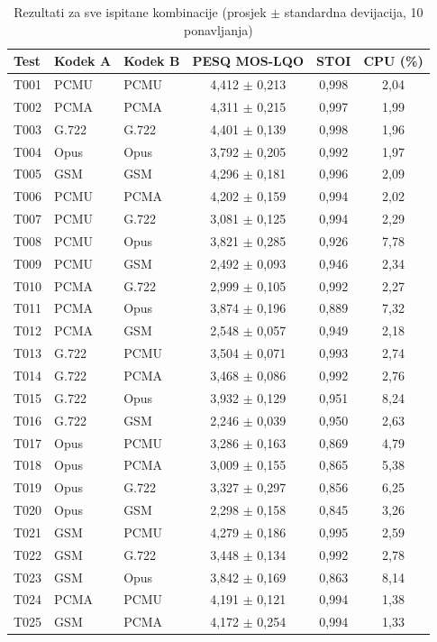 \begin{table}[htbp]
\centering
\caption{Rezultati za sve ispitane kombinacije (prosjek $\pm$ standardna devijacija, 10 ponavljanja)}
\label{tab:complete-results}
\scriptsize
\begin{tabular}{|l|l|l|c|c|c|}
\hline
\textbf{Test} & \textbf{Kodek A} & \textbf{Kodek B} & \textbf{PESQ MOS-LQO} & \textbf{STOI} & \textbf{CPU (\%)} \\
\hline
T001 & PCMU & PCMU & 4,412 $\pm$ 0,213 & 0,998 & 2,04 \\
T002 & PCMA & PCMA & 4,311 $\pm$ 0,215 & 0,997 & 1,99 \\
T003 & G.722 & G.722 & 4,401 $\pm$ 0,139 & 0,998 & 1,96 \\
T004 & Opus & Opus & 3,792 $\pm$ 0,205 & 0,992 & 1,97 \\
T005 & GSM & GSM & 4,296 $\pm$ 0,181 & 0,996 & 2,09 \\
\hline
T006 & PCMU & PCMA & 4,202 $\pm$ 0,159 & 0,994 & 2,02 \\
T007 & PCMU & G.722 & 3,081 $\pm$ 0,125 & 0,994 & 2,29 \\
T008 & PCMU & Opus & 3,821 $\pm$ 0,285 & 0,926 & 7,78 \\
T009 & PCMU & GSM & 2,492 $\pm$ 0,093 & 0,946 & 2,34 \\
T010 & PCMA & G.722 & 2,999 $\pm$ 0,105 & 0,992 & 2,27 \\
T011 & PCMA & Opus & 3,874 $\pm$ 0,196 & 0,889 & 7,32 \\
T012 & PCMA & GSM & 2,548 $\pm$ 0,057 & 0,949 & 2,18 \\
T013 & G.722 & PCMU & 3,504 $\pm$ 0,071 & 0,993 & 2,74 \\
T014 & G.722 & PCMA & 3,468 $\pm$ 0,086 & 0,992 & 2,76 \\
T015 & G.722 & Opus & 3,932 $\pm$ 0,129 & 0,951 & 8,24 \\
T016 & G.722 & GSM & 2,246 $\pm$ 0,039 & 0,950 & 2,63 \\
T017 & Opus & PCMU & 3,286 $\pm$ 0,163 & 0,869 & 4,79 \\
T018 & Opus & PCMA & 3,009 $\pm$ 0,155 & 0,865 & 5,38 \\
T019 & Opus & G.722 & 3,327 $\pm$ 0,297 & 0,856 & 6,25 \\
T020 & Opus & GSM & 2,298 $\pm$ 0,158 & 0,845 & 3,26 \\
T021 & GSM & PCMU & 4,279 $\pm$ 0,186 & 0,995 & 2,59 \\
T022 & GSM & G.722 & 3,448 $\pm$ 0,134 & 0,992 & 2,78 \\
T023 & GSM & Opus & 3,842 $\pm$ 0,169 & 0,863 & 8,14 \\
T024 & PCMA & PCMU & 4,191 $\pm$ 0,121 & 0,994 & 1,38 \\
T025 & GSM & PCMA & 4,172 $\pm$ 0,254 & 0,994 & 1,33 \\
\hline
\end{tabular}
\end{table}
